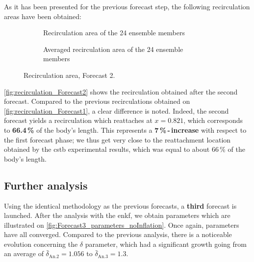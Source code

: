 \documentclass[12pt,twoside]{report}
\begin{document}
As it has been presented for the previous forecast step, the following recirculation areas have been obtained:
\begin{figure}[h!]
    \begin{subfigure}[t]{.48\textwidth}
        \centering
        
        \caption{Recirculation area of the 24 ensemble members}
        \label{fig:recirculation_forecast2_24ensembles}
    \end{subfigure}
\hfill
    \begin{subfigure}[t]{.48\textwidth}
        \centering
        
        \caption{Averaged recirculation area of the 24 ensemble members}
        \label{fig:recirculation_forecast2_24ensemblesAvg}
    \end{subfigure}
    \caption{Recirculation area, Forecast 2.}
    \label{fig:recirculation_Forecast2}
\end{figure}

\autoref{fig:recirculation_Forecast2} shows the recirculation obtained after the second forecast. Compared to the previous recirculations obtained on \autoref{fig:recirculation_Forecast1}, a clear difference is noted. Indeed, the second forecast yields a recirculation which reattaches at $x=0.821$, which corresponds to \textbf{66.4\,\%} of the body's length. This represents a \textbf{7\,\%\,-\,increase} with respect to the first forecast phase; we thus get very close to the reattachment location obtained by the \gls{cstb} experimental results, which was equal to about 66\,\% of the body's length. 


\subsection{Further analysis}
Using the identical methodology as the previous forecasts, a \textbf{third} forecast is launched. After the analysis with the \gls{enkf}, we obtain parameters which are illustrated on \autoref{fig:Forecast3_parameters_noInflation}. Once again, parameters have all converged. Compared to the previous analysis, there is a noticeable evolution concerning the $\delta$ parameter, which had a significant growth going from an average of $\bar{\delta}_{\mathrm{An. 2}}=1.056$ to $\bar{\delta}_{\mathrm{An. 3}}=1.3$. \\
\end{document}
